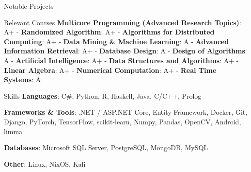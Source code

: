 \documentclass{resume} %
\begin{document}
\begin{rSection}{Notable Projects}

\end{rSection}
\begin{rSection}{Relevant Courses}
\textbf{Multicore Programming (Advanced Research Topics)}: A+ - \textbf{Randomized Algorithm}: A+ - \textbf{Algorithms for Distributed Computing}: A+ - \textbf{Data Mining \& Machine Learning}: A - \textbf{Advanced Information Retrieval}: A+ - \textbf{Database Design}: A - \textbf{Design of Algorithms}: A - \textbf{Artificial Intelligence}: A+ - \textbf{Data Structures and Algorithms}: A+ - \textbf{Linear Algebra}: A+ - \textbf{Numerical Computation}: A+ - \textbf{Real Time Systems}: A
\end{rSection}

\begin{rSection}{Skills}
\textbf{Languages}: C\#, Python, R, Haskell, Java, C/C++, Prolog

\textbf{Frameworks \& Tools}: .NET / ASP.NET Core, Entity Framework, Docker, Git, Django, PyTorch, TensorFlow, scikit-learn, Numpy, Pandas, OpenCV, Android, limma

\textbf{Databases}: Microsoft SQL Server, PostgreSQL, MongoDB, MySQL

\textbf{Other}: Linux, NixOS, Kali

\end{rSection}
\end{document}
